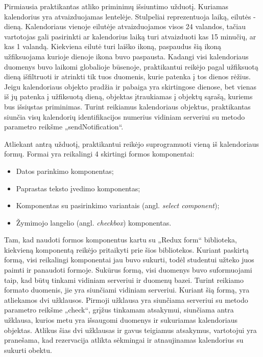 \documentclass{VUMIFPSbakalaurinis}
\begin{document}
Pirmiausia praktikantas atliko priminimų išsiuntimo užduotį. Kuriamas kalendorius yra atvaizduojamas lentelėje. Stulpeliai reprezentuoja laiką, eilutės - dieną. Kalendoriaus vienoje eilutėje atvaizduojamos visos 24 valandos, tačiau vartotojas gali pasirinkti ar kalendorius laiką turi atvaizduoti kas 15 minučių, ar kas 1 valandą. Kiekviena eilutė turi laiško ikoną, paspaudus šią ikoną užfiksuojama kurioje dienoje ikona buvo paspausta. Kadangi visi kalendoriaus duomenys buvo laikomi globalioje būsenoje, praktikantui reikėjo pagal užfiksuotą dieną išfiltruoti ir atrinkti tik tuos duomenis, kurie patenka į tos dienos rėžius. Jeigu kalendoriaus objekto pradžia ir pabaiga yra skirtingose dienose, bet vienas iš jų patenka į užfiksuotą dieną, objektas įtraukiamas į objektų sąrašą, kuriems bus išsiųstas priminimas. Turint reikiamus kalendoriaus objektus, praktikantas siunčia visų kalendorių identifikacijos numerius vidiniam serveriui su metodo parametro reikšme „sendNotification“.

Atliekant antrą užduotį, praktikantui reikėjo suprogramuoti vieną iš kalendoriaus formų. Formai yra reikalingi 4 skirtingi formos komponentai:
\begin{itemize}
    \item Datos parinkimo komponentas;
    \item Paprastas teksto įvedimo komponentas;
    \item Komponentas su pasirinkimo variantais (angl. \textit{select component});
    \item Žymimojo langelio (angl. \textit{checkbox}) komponentas.
\end{itemize} 
Tam, kad naudoti formos komponentus kartu su „Redux form“ biblioteka, kiekvieną komponentą reikėjo pritaikyti prie šios bibliotekos. Kuriant paskirtą formą, visi reikalingi komponentai jau buvo sukurti, todėl studentui užteko juos paimti ir panaudoti formoje. Sukūrus formą, visi duomenys buvo suformuojami taip, kad būtų tinkami vidiniam serveriui ir duomenų bazei. Turint reikiamo formato duomenis, jie yra siunčiami vidiniam serveriui. Kuriant šią formą, yra atliekamos dvi užklausos. Pirmoji užklausa yra siunčiama serveriui su metodo parametro reikšme „check“, grįžus tinkamam atsakymui, siunčiama antra užklausa, kurios metu yra išsaugomi duomenys ir sukuriamas kalendoriaus objektas. Atlikus šias dvi užklausas ir gavus teigiamus atsakymus, vartotojui yra pranešama, kad rezervacija atlikta sėkmingai ir atnaujinamas kalendorius su sukurti obektu.
\end{document}
